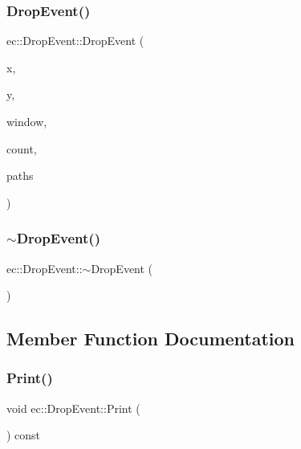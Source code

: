 \subsubsection{\texorpdfstring{Drop\+Event()}{DropEvent()}\hspace{0.1cm}{\footnotesize\ttfamily [2/2]}}
{\footnotesize\ttfamily ec\+::\+Drop\+Event\+::\+Drop\+Event (\begin{DoxyParamCaption}\item[{int}]{x,  }\item[{int}]{y,  }\item[{G\+L\+F\+Wwindow $\ast$}]{window,  }\item[{const int}]{count,  }\item[{const char $\ast$$\ast$}]{paths }\end{DoxyParamCaption})\hspace{0.3cm}{\ttfamily [explicit]}}

\mbox{\label{structec_1_1_drop_event_ad68bca5b7ca0c65690fc85d682d057db}} 
\subsubsection{\texorpdfstring{$\sim$\+Drop\+Event()}{~DropEvent()}}
{\footnotesize\ttfamily ec\+::\+Drop\+Event\+::$\sim$\+Drop\+Event (\begin{DoxyParamCaption}{ }\end{DoxyParamCaption})}



\subsection{Member Function Documentation}
\mbox{\label{structec_1_1_drop_event_a027a7f2198874f6a2267b7c22f9ff2b7}} 
\subsubsection{\texorpdfstring{Print()}{Print()}}
{\footnotesize\ttfamily void ec\+::\+Drop\+Event\+::\+Print (\begin{DoxyParamCaption}{ }\end{DoxyParamCaption}) const}



